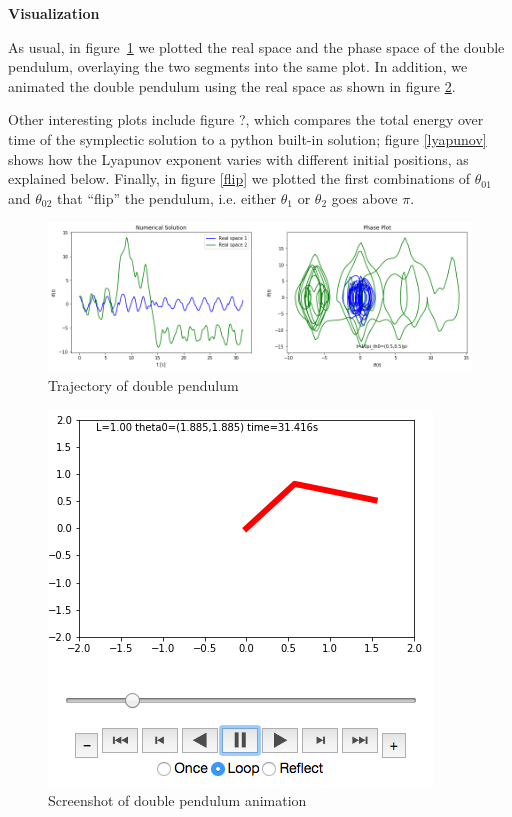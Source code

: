 \begin{problem}{1}
\textbf{Visualization}

As usual, in figure~\ref{double} we plotted the real space and the phase space
of the double pendulum, overlaying the two segments into the same plot. In addition,
we animated the double pendulum using the real space as shown in figure \ref{anim}.

Other interesting plots include figure ?, which compares the total energy over
time of the symplectic solution to a python built-in solution; figure
\ref{lyapunov} shows how the Lyapunov exponent varies with different initial
positions, as explained below. Finally, in figure \ref{flip} we plotted the first
combinations of $\theta_{01}$ and $\theta_{02}$ that ``flip'' the pendulum, i.e.
either $\theta_1$ or $\theta_2$ goes above $\pi$.

\begin{figure}[ht!]
	\centering
	\includegraphics[scale=0.6]{../figures/t=10pi_th0=(05,05)pidoublePend.png}
	\caption{Trajectory of double pendulum}
	\label{double}
\end{figure}

\begin{figure}[ht!]
	\centering
	\includegraphics[scale=0.5]{../figures/doublePendAnim.png}
	\caption{Screenshot of double pendulum animation}
	\label{anim}
\end{figure}

\end{problem}

